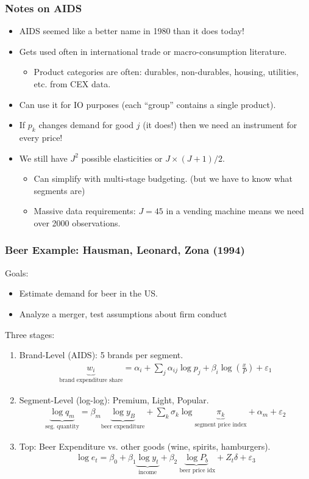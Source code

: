 \documentclass[xcolor=pdftex,dvipsnames,table,mathserif,aspectratio=169]{beamer}
\begin{document}
\begin{frame}
\frametitle{Notes on AIDS}
\begin{itemize}
\item AIDS seemed like a better name in 1980 than it does today!
\item Gets used often in international trade or macro-consumption literature.
\begin{itemize}
\item Product categories are often: durables, non-durables, housing, utilities, etc. from CEX data.
\end{itemize}
\item Can use it for IO purposes (each ``group'' contains a single product).
\item If $p_k$ changes demand for good $j$ (it does!) then we need an instrument for every price!
\item We still have $J^2$ possible elasticities or $J \times (J+1)/2$.
\begin{itemize}
\item Can simplify with multi-stage budgeting. (but we have to know what segments are)
\item Massive data requirements: $J=45$ in a vending machine means we need over 2000 observations.
\end{itemize}
\end{itemize}
\end{frame}

\begin{frame}
\frametitle{Beer Example: Hausman, Leonard, Zona (1994)}
\small
Goals:
\begin{itemize}
\item Estimate demand for beer in the US.
\item Analyze a merger, test assumptions about firm conduct
\end{itemize}
Three stages:
\begin{enumerate}
\item Brand-Level (AIDS): 5 brands per segment.
\begin{eqnarray*}
\underbrace{w_i}_{\text{brand expenditure share}} = \alpha_i + \sum_j \alpha_{ij} \log p_j + \beta_i \log \left(\frac{x}{P} \right) + \varepsilon_1
\end{eqnarray*}
\item Segment-Level (log-log): Premium, Light, Popular.
\begin{eqnarray*}
\underbrace{\log q_m}_{\text{seg. quantity}} = \beta_m \underbrace{\log y_B}_{ \text{beer expenditure}} + \sum_k \sigma_k \log \underbrace{\pi_k}_{\text{segment price index}} + \alpha_m + \varepsilon_2
\end{eqnarray*}
\item Top: Beer Expenditure  vs. other goods (wine, spirits, hamburgers).
\begin{eqnarray*}
\log e_t = \beta_0 + \beta_1 \underbrace{\log y_t}_{\text{income}} + \beta_2 \underbrace{\log P_b}_{\text{ beer price idx}} + Z_t \delta + \varepsilon_3
\end{eqnarray*}
\end{enumerate}
\end{frame}
\end{document}
